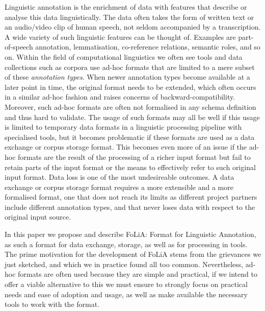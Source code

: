\documentclass[a4paper,10pt,twoside]{article}
\begin{document}
Linguistic annotation is the enrichment of data with features that describe or
analyse this data linguistically. The data often takes the form of written text
or an audio/video clip of human speech, not seldom accompanied by a
transcription. A wide variety of such linguistic features can be thought of.
Examples are part-of-speech annotation, lemmatisation, co-reference relations,
semantic roles, and so on. Within the field of computational linguistics we
often see tools and data collections such as corpora use ad-hoc formats that
are limited to a mere subset of these \emph{annotation types}. When newer
annotation types become available at a later point in time, the original format
needs to be extended, which often occurs in a similar ad-hoc fashion and raises
concerns of backward-compatibility. Moreover, such ad-hoc formats are often not
formalised in any schema definition and thus hard to validate. The usage of
such formats may all be well if this usage is limited to temporary data formats
in a linguistic processing pipeline with specialised tools, but it becomes
problematic if these formats are used as a data exchange or corpus storage
format. This becomes even more of an issue if the ad-hoc formats are the result
of the processing of a richer input format but fail to retain parts of the
input format or the means to effectively refer to such original input format.
Data loss is one of the most undesireable outcomes. A data exchange or corpus
storage format requires a more extensible and a more formalised format, one
that does not reach its limits as different project partners include different
annotation types, and that never loses data with respect to the original input
source.

In this paper we propose and describe FoLiA: Format for Linguistic Annotation,
as such a format for data exchange, storage, as well as for processing in
tools. The prime motivation for the development of FoLiA stems from the
grievances we just sketched, and which we in practice found all too common.
Nevertheless, ad-hoc formats are often used because they are simple and
practical, if we intend to offer a viable alternative to this we must ensure to
strongly focus on practical needs and ease of adoption and usage, as well as
make available the necessary tools to work with the format. 
\end{document}

